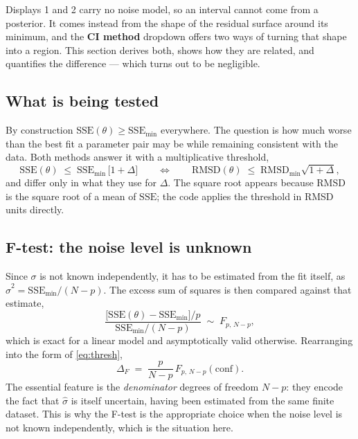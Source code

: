 \documentclass[11pt,a4paper]{article}
\newcommand{\SSE}{\mathrm{SSE}}
\newcommand{\RMSD}{\mathrm{RMSD}}
\begin{document}
Displays 1 and 2 carry no noise model, so an interval cannot come from a
posterior. It comes instead from the shape of the residual surface around
its minimum, and the \textbf{CI method} dropdown offers two ways of turning
that shape into a region. This section derives both, shows how they are
related, and quantifies the difference --- which turns out to be negligible.

\subsection{What is being tested}

By construction $\SSE(\theta)\ge \SSE_{\min}$ everywhere. The question is
how much worse than the best fit a parameter pair may be while remaining
consistent with the data. Both methods answer it with a multiplicative
threshold,
\begin{equation}
\SSE(\theta) \;\le\; \SSE_{\min}\,\bigl[1+\Delta\bigr]
\qquad\Longleftrightarrow\qquad
\RMSD(\theta) \;\le\; \RMSD_{\min}\sqrt{1+\Delta},
\label{eq:thresh}
\end{equation}
and differ only in what they use for $\Delta$. The square root appears
because RMSD is the square root of a mean of $\SSE$; the code applies the
threshold in RMSD units directly.

\subsection{F-test: the noise level is unknown}

Since $\sigma$ is not known independently, it has to be estimated from the
fit itself, as $\hat{\sigma}^2 = \SSE_{\min}/(N-p)$. The excess sum of
squares is then compared against that estimate,
\begin{equation}
\frac{\bigl[\SSE(\theta)-\SSE_{\min}\bigr]/p}
{\SSE_{\min}/(N-p)} \;\sim\; F_{p,\,N-p},
\end{equation}
which is exact for a linear model and asymptotically valid otherwise.
Rearranging into the form of \eqref{eq:thresh},
\begin{equation}
\Delta_{F} \;=\; \frac{p}{N-p}\,F_{p,\,N-p}(\text{conf}).
\label{eq:ftest}
\end{equation}
The essential feature is the \emph{denominator} degrees of freedom $N-p$:
they encode the fact that $\hat{\sigma}$ is itself uncertain, having been
estimated from the same finite dataset. This is why the F-test is the
appropriate choice when the noise level is not known independently, which
is the situation here.
\end{document}
